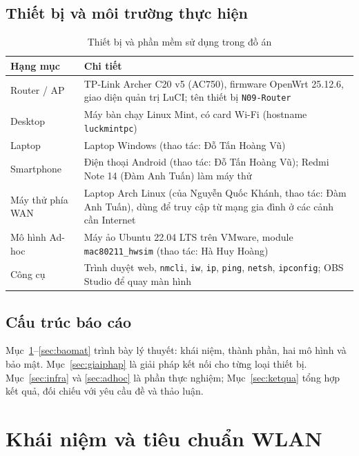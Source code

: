 \documentclass[12pt,a4paper]{article}
\numberwithin{figure}{section}
\numberwithin{table}{section}
\newcommand{\mono}[1]{\texttt{#1}}
\begin{document}
\subsection{Thiết bị và môi trường thực hiện}
\begin{table}[H]
  \centering\small
  \caption{Thiết bị và phần mềm sử dụng trong đồ án}
  \label{tab:thietbi}
  \begin{tabularx}{\linewidth}{@{}P{3.4cm} L@{}}
    \toprule
    \textbf{Hạng mục} & \textbf{Chi tiết}\\
    \midrule
    Router / AP & TP-Link Archer C20 v5 (AC750), firmware OpenWrt
    25.12.6, giao diện quản trị LuCI; tên thiết bị \mono{N09-Router}\\
    Desktop & Máy bàn chạy Linux Mint, có card Wi-Fi (hostname \mono{luckmintpc})\\
    Laptop & Laptop Windows (thao tác: Đỗ Tấn Hoàng Vũ)\\
    Smartphone & Điện thoại Android (thao tác: Đỗ Tấn Hoàng Vũ); Redmi Note 14 (Đàm Anh Tuấn) làm máy thử\\
    Máy thử phía WAN & Laptop Arch Linux (của Nguyễn Quốc Khánh, thao tác: Đàm Anh Tuấn), dùng để truy cập từ mạng gia đình ở các cảnh cần Internet\\
    Mô hình Ad-hoc & Máy ảo Ubuntu 22.04 LTS trên VMware, module
    \mono{mac80211\_hwsim} (thao tác: Hà Huy Hoàng)\\
    Công cụ & Trình duyệt web, \mono{nmcli}, \mono{iw}, \mono{ip}, \mono{ping},
    \mono{netsh}, \mono{ipconfig}; OBS Studio để quay màn hình\\
    \bottomrule
  \end{tabularx}
\end{table}

\subsection{Cấu trúc báo cáo}
Mục~\ref{sec:khainiem}--\ref{sec:baomat} trình bày lý thuyết: khái niệm,
thành phần, hai mô hình và bảo mật. Mục~\ref{sec:giaiphap} là giải pháp kết
nối cho từng loại thiết bị. Mục~\ref{sec:infra} và \ref{sec:adhoc} là phần
thực nghiệm; Mục~\ref{sec:ketqua} tổng hợp kết quả, đối chiếu với yêu cầu đề
và thảo luận.

\section{Khái niệm và tiêu chuẩn WLAN}
\label{sec:khainiem}
\end{document}

